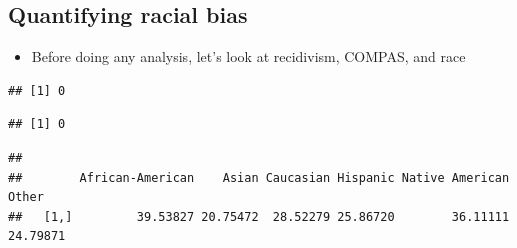 \documentclass[
]{article}
\newenvironment{Shaded}{\begin{snugshade}}{\end{snugshade}}
\newcommand{\DecValTok}[1]{\textcolor[rgb]{0.00,0.00,0.81}{#1}}
\newcommand{\FunctionTok}[1]{\textcolor[rgb]{0.00,0.00,0.00}{#1}}
\newcommand{\NormalTok}[1]{#1}
\newcommand{\OtherTok}[1]{\textcolor[rgb]{0.56,0.35,0.01}{#1}}
\newcommand{\SpecialCharTok}[1]{\textcolor[rgb]{0.00,0.00,0.00}{#1}}
\providecommand{\tightlist}{%
  \setlength{\itemsep}{0pt}\setlength{\parskip}{0pt}}
\begin{document}
\hypertarget{quantifying-racial-bias}{%
\subsection{Quantifying racial bias}\label{quantifying-racial-bias}}

\begin{itemize}
\tightlist
\item
  Before doing any analysis, let's look at recidivism, COMPAS, and race
\end{itemize}

\begin{Shaded}
\end{Shaded}

\begin{verbatim}
## [1] 0
\end{verbatim}

\begin{Shaded}
\end{Shaded}

\begin{verbatim}
## [1] 0
\end{verbatim}

\begin{Shaded}
\end{Shaded}

\begin{verbatim}
##       
##        African-American    Asian Caucasian Hispanic Native American    Other
##   [1,]         39.53827 20.75472  28.52279 25.86720        36.11111 24.79871
\end{verbatim}
\end{document}
